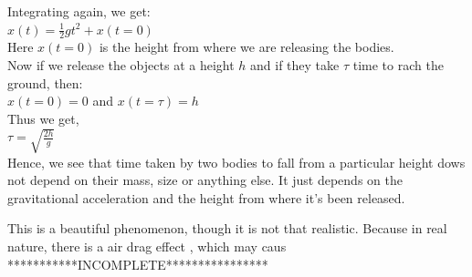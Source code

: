 \documentclass[24pt]{article}
\begin{document}
Integrating again, we get:\\

$x(t)=\frac{1}{2} g t^2 + x(t=0)$\\

Here $x(t=0)$ is the height from where we are releasing the bodies.\\
Now if we release the objects at a height $h$ and if they take $\tau$ time to rach the ground, then:\\
$x(t=0)=0$ and $x(t=\tau)=h$\\

Thus we get, \\

$\tau=\sqrt{\frac{2 h}{g}}$\\

Hence, we see that time taken by two bodies to fall from a particular height dows not depend on their mass, size or anything else. It just depends on the gravitational acceleration and the height from where it's been released.

This is a beautiful phenomenon, though it is not that realistic. Because in real nature, there is a air drag effect , which may caus\\
***********INCOMPLETE****************
\end{document}
